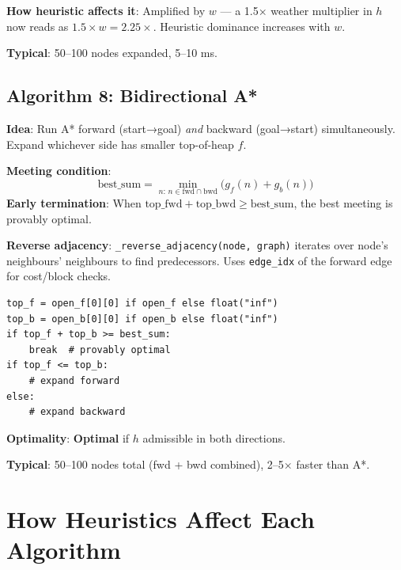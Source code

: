 \documentclass[11pt,a4paper]{article}
\begin{document}
\textbf{How heuristic affects it}: Amplified by $w$ — a 1.5× weather multiplier in $h$ now reads as $1.5\times w = 2.25\times$. Heuristic dominance increases with $w$.

\textbf{Typical}: 50–100 nodes expanded, 5–10 ms.

\subsection{Algorithm 8: Bidirectional A*}

\textbf{Idea}: Run A* forward (start→goal) \textit{and} backward (goal→start) simultaneously. Expand whichever side has smaller top-of-heap $f$.

\textbf{Meeting condition}:
\[
\text{best\_sum} = \min_{n:\,n\in\text{fwd}\cap\text{bwd}} \bigl(g_f(n) + g_b(n)\bigr)
\]
\textbf{Early termination}: When $\text{top\_fwd} + \text{top\_bwd} \ge \text{best\_sum}$, the best meeting is provably optimal.

\textbf{Reverse adjacency}: \texttt{\_reverse\_adjacency(node, graph)} iterates over node's neighbours' neighbours to find predecessors. Uses \texttt{edge\_idx} of the forward edge for cost/block checks.

\begin{lstlisting}[caption={bidirectional\_astar.py — expansion decision}]
top_f = open_f[0][0] if open_f else float("inf")
top_b = open_b[0][0] if open_b else float("inf")
if top_f + top_b >= best_sum:
    break  # provably optimal
if top_f <= top_b:
    # expand forward
else:
    # expand backward
\end{lstlisting}

\textbf{Optimality}: \textbf{Optimal} if $h$ admissible in both directions.

\textbf{Typical}: 50–100 nodes total (fwd + bwd combined), 2–5× faster than A*.

\section{How Heuristics Affect Each Algorithm}
\end{document}
